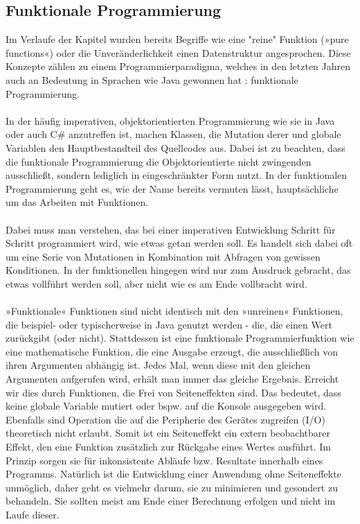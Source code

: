 \subsection{Funktionale Programmierung}
Im Verlaufe der Kapitel wurden bereits Begriffe wie eine "reine" Funktion (»pure functions«) oder die Unveränderlichkeit einen Datenstruktur angesprochen. Diese Konzepte zählen zu einem Programmierparadigma, welches in den letzten Jahren auch an Bedeutung in Sprachen wie Java gewonnen hat
\cite{javaFunctionalProgramming}
: funktionale Programmierung.
\\\\
In der häufig imperativen, objektorientierten Programmierung wie sie in Java oder auch C\# anzutreffen ist, machen Klassen, die Mutation derer und globale Variablen den Hauptbestandteil des Quellcodes aus. Dabei ist zu beachten, dass die funktionale Programmierung die Objektorientierte nicht zwingenden ausschließt, sondern lediglich in eingeschränkter Form nutzt. In der funktionalen Programmierung geht es, wie der Name bereits vermuten lässt, hauptsächliche um das Arbeiten mit Funktionen.
\\\\ 
Dabei muss man verstehen, das bei einer imperativen Entwicklung Schritt für Schritt programmiert wird, wie etwas getan werden soll. Es handelt sich dabei oft um eine Serie von Mutationen in Kombination mit Abfragen von gewissen Konditionen. In der funktionellen hingegen wird nur zum Ausdruck gebracht, das etwas vollführt werden soll, aber nicht wie es am Ende vollbracht wird. 
\\\\
»Funktionale« Funktionen sind nicht identisch mit den »unreinen« Funktionen, die beispiel- oder typischerweise in Java genutzt werden - die, die einen Wert zurückgibt (oder nicht). Stattdessen ist eine funktionale Programmierfunktion wie eine mathematische Funktion, die eine Ausgabe erzeugt, die ausschließlich von ihren Argumenten abhängig ist. Jedes Mal, wenn diese mit den gleichen Argumenten aufgerufen wird, erhält man immer das gleiche Ergebnis. Erreicht wir dies durch Funktionen, die Frei von Seiteneffekten sind. Das bedeutet, dass keine globale Variable mutiert oder bspw. auf die Konsole ausgegeben wird. Ebenfalls sind Operation die auf die Peripherie des Gerätes zugreifen (I/O) theoretisch nicht erlaubt. Somit ist ein  Seiteneffekt ein extern beobachtbarer Effekt, den eine Funktion zusätzlich zur Rückgabe eines Wertes ausführt. Im Prinzip sorgen sie für inkonsistente Abläufe bzw. Resultate innerhalb eines Programms. Natürlich ist die Entwicklung einer Anwendung ohne Seiteneffekte unmöglich, daher geht es vielmehr darum, sie zu minimieren und gesondert zu behandeln. Sie sollten meist am Ende einer Berechnung erfolgen und nicht im Laufe dieser.
